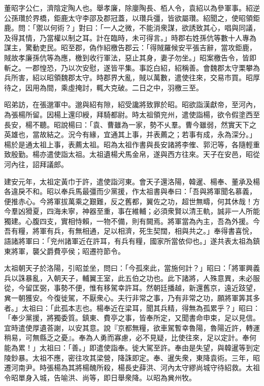 
\begin{pinyinscope}
董昭字公仁，濟陰定陶人也。舉孝廉，除廮陶長、栢人令，袁紹以為參軍事。紹逆公孫瓚於界橋，鉅鹿太守李邵及郡冠蓋，以瓚兵彊，皆欲屬瓚。紹聞之，使昭領鉅鹿。問：「禦以何術？」對曰：「一人之微，不能消衆謀，欲誘致其心，唱與同議，及得其情，乃當權以制之耳。計在臨時，未可得言。」時郡右姓孫伉等數十人專為謀主，驚動吏民。昭至郡，偽作紹檄告郡云：「得賊羅候安平張吉辭，當攻鉅鹿，賊故孝廉孫伉等為應，檄到收行軍法，惡止其身，妻子勿坐。」昭案檄告令，皆即斬之。一郡惶恐，乃以次安慰，遂皆平集。事訖白紹，紹稱善。會魏郡太守栗攀為兵所害，紹以昭領魏郡太守。時郡界大亂，賊以萬數，遣使往來，交易市買。昭厚待之，因用為間，乘虛掩討，輒大克破。二日之中，羽檄三至。

昭弟訪，在張邈軍中。邈與紹有隙，紹受讒將致罪於昭。昭欲詣漢獻帝，至河內，為張楊所留。因楊上還印綬，拜騎都尉。時太祖領兖州，遣使詣楊，欲令假塗西至長安，楊不聽。昭說楊曰：「袁、曹雖為一家，勢不乆羣。曹今雖弱，然實天下之英雄也，當故結之。況今有緣，宜通其上事，并表薦之；若事有成，永為深分。」楊於是通太祖上事，表薦太祖。昭為太祖作書與長安諸將李傕、郭汜等，各隨輕重致殷勤。楊亦遣使詣太祖。太祖遺楊犬馬金帛，遂與西方往來。天子在安邑，昭從河內往，詔拜議郎。

建安元年，太祖定黃巾于許，遣使詣河東。會天子還洛陽，韓暹、楊奉、董承及楊各違戾不和。昭以奉兵馬最彊而少黨援，作太祖書與奉曰：「吾與將軍聞名慕義，便推赤心。今將軍拔萬乘之艱難，反之舊都，翼佐之功，超世無疇，何其休哉！方今羣凶猾夏，四海未寧，神器至重，事在維輔；必須衆賢以清王軌，誠非一人所能獨建。心腹四支，實相恃賴，一物不備，則有闕焉。將軍當為內主，吾為外援。今吾有糧，將軍有兵，有無相通，足以相濟，死生契闊，相與共之。」奉得書喜恱，語諸將軍曰：「兖州諸軍近在許耳，有兵有糧，國家所當依仰也。」遂共表太祖為鎮東將軍，襲父爵費亭侯；昭遷符節令。

太祖朝天子於洛陽，引昭並坐，問曰：「今孤來此，當施何計？」昭曰：「將軍興義兵以誅暴亂，入朝天子，輔翼王室，此五伯之功也。此下諸將，人殊意異，未必服從，今留匡弼，事勢不便，惟有移駕幸許耳。然朝廷播越，新還舊京，遠近跂望，兾一朝獲安。今復徙駕，不厭衆心。夫行非常之事，乃有非常之功，願將軍筭其多者。」太祖曰：「此孤本志也。楊奉近在梁耳，聞其兵精，得無為孤累乎？」昭曰：「奉少黨援，將獨委質。鎮東、費亭之事，皆奉所定，又聞書命申束，足以見信。宜時遣使厚遺荅謝，以安其意。說『京都無糧，欲車駕暫幸魯陽，魯陽近許，轉運稍易，可無縣乏之憂』。奉為人勇而寡慮，必不見疑，比使往來，足以定計。奉何能為累！」太祖曰：「善。」即遣使詣奉。徙大駕至許。奉由是失望，與韓暹等到定陵鈔暴。太祖不應，密往攻其梁營，降誅即定。奉、暹失衆，東降袁術。三年，昭遷河南尹。時張楊為其將楊醜所殺，楊長史薛洪、河內太守繆尚城守待紹救。太祖令昭單身入城，告喻洪、尚等，即日舉衆降。以昭為兾州牧。


\end{pinyinscope}
